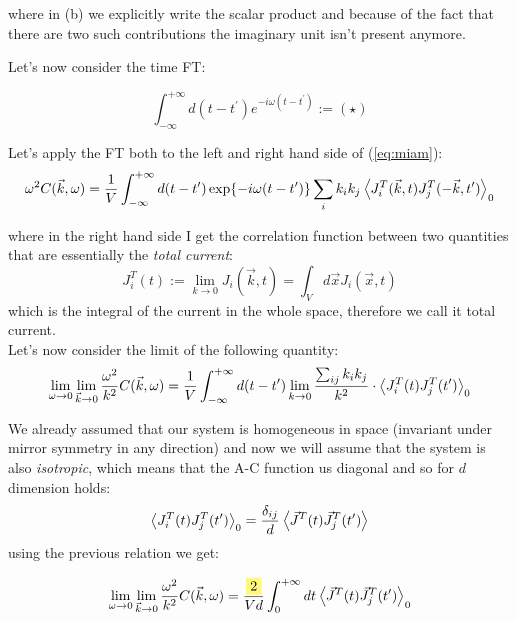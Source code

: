 \documentclass[\main/main.tex]{subfiles}
\begin{document}
where in (b) we explicitly write the scalar product and because of the fact that there are two such contributions the imaginary unit isn't present anymore.

Let's now consider the time FT:

\begin{equation}
    \int_{-\infty}^{+\infty} d\left(t-t^{\prime}\right) e^{-i \omega\left(t-t^{\prime}\right)} := ({\star})
\end{equation}

Let's apply the FT both to the left and right hand side of (\ref{eq:miam}):
\begin{equation}
    \omega^2 C(\vec{k},\omega)=\frac{1}{V}\int_{-\infty}^{+\infty}d(t-t')\exp{-i\omega(t-t')}\sum_i k_ik_j\left\langle J_i^T(\vec{k}, t)J_j^{T}(-\vec{k},t') \right\rangle_0
\end{equation}


where in the right hand side I get the correlation
function between two quantities that are essentially the \textit{total current}:
\begin{equation}
    J_{i}^{T}(t) := \lim_{k\to 0} J_{i}(\vec{k}, t)= \int_V d\vec{x}J_i(\vec{x},t)
\end{equation}
which is the integral of the current in the whole space, therefore we call it total current. \\

Let's now consider the limit of the following quantity:
\begin{align}
    \lim _{\omega \rightarrow 0} \lim _{\vec{k} \rightarrow 0} \frac{\omega^{2}}{k^{2}} C(\vec{k}, \omega)=\frac{1}{V}\int_{-\infty}^{+\infty} d(t-t')\lim_{k\to 0}\frac{\sum_{ij}k_ik_j}{k^2}\cdot\left\langle J_{i}^T(t)J_{j}^T(t') \right\rangle_0
\end{align}

We already assumed that our system is homogeneous in space (invariant under mirror symmetry in any direction)
 and now we will assume that the system is also \textit{isotropic}, which means that the A-C function us diagonal and so for $d$ dimension holds:
\begin{equation}
    \left\langle J_{i}^T(t)J_{j}^T(t') \right\rangle_0=\frac{\delta_{ij}}{d}\left\langle \vec{J}^T(t)\vec{J}_j^T(t') \right\rangle
\end{equation}
using the previous relation we get:

\begin{align}
     \lim _{\omega \rightarrow 0} \lim _{\vec{k} \rightarrow 0} \frac{\omega^{2}}{k^{2}} C(\vec{k}, \omega)=\frac{\hlc{yellow}{2}}{Vd}\int_{0}^{+\infty}dt \mean{\vec{J}^T(t)\vec{J}_j^T(t')}_0
     \label{eq:prev}
\end{align}
\end{document}
